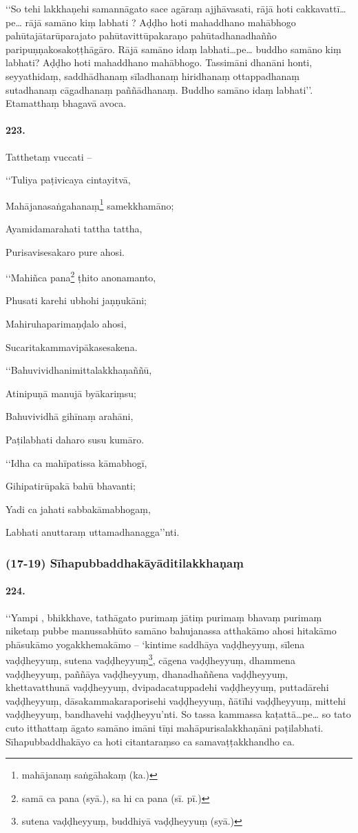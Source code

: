 ‘‘So tehi lakkhaṇehi samannāgato sace agāraṃ ajjhāvasati, rājā hoti cakkavattī…pe… rājā samāno kiṃ labhati ? Aḍḍho hoti mahaddhano mahābhogo pahūtajātarūparajato pahūtavittūpakaraṇo pahūtadhanadhañño paripuṇṇakosakoṭṭhāgāro. Rājā samāno idaṃ labhati…pe… buddho samāno kiṃ labhati? Aḍḍho hoti mahaddhano mahābhogo. Tassimāni dhanāni honti, seyyathidaṃ, saddhādhanaṃ sīladhanaṃ hiridhanaṃ ottappadhanaṃ sutadhanaṃ cāgadhanaṃ paññādhanaṃ. Buddho samāno idaṃ labhati’’. Etamatthaṃ bhagavā avoca.

\paragraph{223.} Tatthetaṃ vuccati –

‘‘Tuliya paṭivicaya cintayitvā,

Mahājanasaṅgahanaṃ\footnote{mahājanaṃ saṅgāhakaṃ (ka.)} samekkhamāno;

Ayamidamarahati tattha tattha,

Purisavisesakaro pure ahosi.

‘‘Mahiñca pana\footnote{samā ca pana (syā.), sa hi ca pana (sī. pī.)} ṭhito anonamanto,

Phusati karehi ubhohi jaṇṇukāni;

Mahiruhaparimaṇḍalo ahosi,

Sucaritakammavipākasesakena.

‘‘Bahuvividhanimittalakkhaṇaññū,

Atinipuṇā manujā byākariṃsu;

Bahuvividhā gihīnaṃ arahāni,

Paṭilabhati daharo susu kumāro.

‘‘Idha ca mahīpatissa kāmabhogī,

Gihipatirūpakā bahū bhavanti;

Yadi ca jahati sabbakāmabhogaṃ,

Labhati anuttaraṃ uttamadhanagga’’nti.

\subsubsection{(17-19) Sīhapubbaddhakāyāditilakkhaṇaṃ}

\paragraph{224.} ‘‘Yampi , bhikkhave, tathāgato purimaṃ jātiṃ purimaṃ bhavaṃ purimaṃ niketaṃ pubbe manussabhūto samāno bahujanassa atthakāmo ahosi hitakāmo phāsukāmo yogakkhemakāmo – ‘kintime saddhāya vaḍḍheyyuṃ, sīlena vaḍḍheyyuṃ, sutena vaḍḍheyyuṃ\footnote{sutena vaḍḍheyyuṃ, buddhiyā vaḍḍheyyuṃ (syā.)}, cāgena vaḍḍheyyuṃ, dhammena vaḍḍheyyuṃ, paññāya vaḍḍheyyuṃ, dhanadhaññena vaḍḍheyyuṃ, khettavatthunā vaḍḍheyyuṃ, dvipadacatuppadehi vaḍḍheyyuṃ, puttadārehi vaḍḍheyyuṃ, dāsakammakaraporisehi vaḍḍheyyuṃ, ñātīhi vaḍḍheyyuṃ, mittehi vaḍḍheyyuṃ, bandhavehi vaḍḍheyyu’nti. So tassa kammassa kaṭattā…pe… so tato cuto itthattaṃ āgato samāno imāni tīṇi mahāpurisalakkhaṇāni paṭilabhati. Sīhapubbaddhakāyo ca hoti citantaraṃso ca samavaṭṭakkhandho ca.


